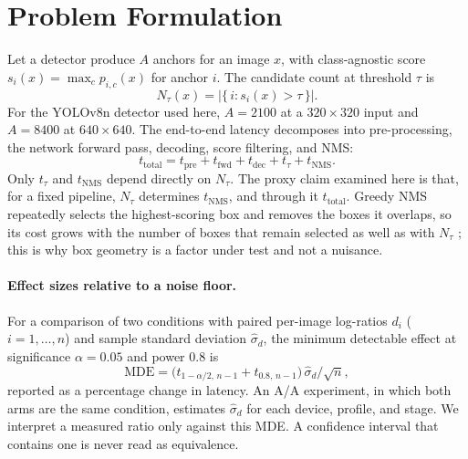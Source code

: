 \documentclass[a4paper,fleqn]{cas-dc}
\newcommand{\Ntau}{N_{\tau}}
\begin{document}
\section{Problem Formulation}
Let a detector produce $A$ anchors for an image $x$, with class-agnostic score $s_i(x)=\max_c p_{i,c}(x)$ for anchor $i$. The candidate count at threshold $\tau$ is
\begin{equation}
\Ntau(x)=\bigl|\{\, i : s_i(x) > \tau \,\}\bigr| .
\end{equation}
For the YOLOv8n detector used here, $A=2100$ at a $320\times320$ input and $A=8400$ at $640\times640$. The end-to-end latency decomposes into pre-processing, the network forward pass, decoding, score filtering, and NMS:
\begin{equation}
t_{\mathrm{total}} = t_{\mathrm{pre}} + t_{\mathrm{fwd}} + t_{\mathrm{dec}} + t_{\tau} + t_{\mathrm{NMS}} .
\end{equation}
Only $t_{\tau}$ and $t_{\mathrm{NMS}}$ depend directly on $\Ntau$. The proxy claim examined here is that, for a fixed pipeline, $\Ntau$ determines $t_{\mathrm{NMS}}$, and through it $t_{\mathrm{total}}$. Greedy NMS repeatedly selects the highest-scoring box and removes the boxes it overlaps, so its cost grows with the number of boxes that remain selected as well as with $\Ntau$ \cite{neubeck2006nms}; this is why box geometry is a factor under test and not a nuisance.

\paragraph{Effect sizes relative to a noise floor.}
For a comparison of two conditions with paired per-image log-ratios $d_i$ ($i=1,\dots,n$) and sample standard deviation $\hat\sigma_d$, the minimum detectable effect at significance $\alpha=0.05$ and power $0.8$ is
\begin{equation}
\mathrm{MDE}=\bigl(t_{1-\alpha/2,\,n-1}+t_{0.8,\,n-1}\bigr)\,\hat\sigma_d/\sqrt{n},
\end{equation}
reported as a percentage change in latency. An A/A experiment, in which both arms are the same condition, estimates $\hat\sigma_d$ for each device, profile, and stage. We interpret a measured ratio only against this MDE. A confidence interval that contains one is never read as equivalence.
\end{document}
